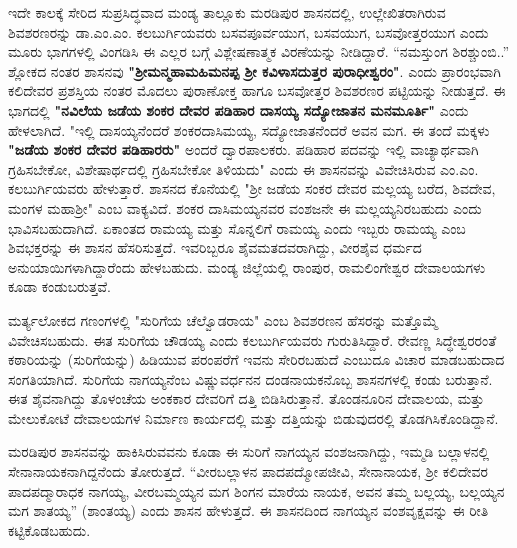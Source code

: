 ಇದೇ ಕಾಲಕ್ಕೆ ಸೇರಿದ ಸುಪ್ರಸಿದ್ಧವಾದ ಮಂಡ್ಯ ತಾಲ್ಲೂಕು ಮರಡಿಪುರ ಶಾಸನದಲ್ಲಿ, ಉಲ್ಲೇಖಿತರಾಗಿರುವ ಶಿವಶರಣರನ್ನು ಡಾ.ಎಂ.ಎಂ. ಕಲಬುರ್ಗಿಯವರು ಬಸವಪೂರ್ವಯುಗ, ಬಸವಯುಗ, ಬಸವೋತ್ತರಯುಗ ಎಂದು ಮೂರು ಭಾಗಗಳಲ್ಲಿ ವಿಂಗಡಿಸಿ ಈ ಎಲ್ಲರ ಬಗ್ಗೆ ವಿಶ್ಲೇಷಣಾತ್ಮಕ ವಿರಣೆಯನ್ನು ನೀಡಿದ್ದಾರೆ. “ನಮಸ್ತುಂಗ ಶಿರಶ್ಚುಂಬಿ..” ಶ್ಲೋಕದ ನಂತರ ಶಾಸನವು \textbf{"ಶ‍್ರೀಮನ್ಮಹಾಮಹಿಮನಪ್ಪ ಶ‍್ರೀ ಕವಿಳಾಸದುತ್ತರ ಪುರಾಧೀಶ್ವರಂ"}. ಎಂದು ಪ್ರಾರಂಭವಾಗಿ ಕಲಿದೇವರ ಪ್ರಶಸ್ತಿಯ ನಂತರ ಮೊದಲು ಪುರಾಣೋಕ್ತ ಹಾಗೂ ಬಸವೋತ್ತರ ಶಿವಶರಣರ ಪಟ್ಟಿಯನ್ನು ನೀಡುತ್ತದೆ. ಈ ಭಾಗದಲ್ಲಿ \textbf{"ನವಿಲೆಯ ಜಡೆಯ ಶಂಕರ ದೇವರ ಪಡಿಹಾರ ದಾಸಯ್ಯ ಸದ್ಯೋಜಾತನ ಮನಮೂರ್ತಿ"} ಎಂದು ಹೇಳಲಾಗಿದೆ. "ಇಲ್ಲಿ ದಾಸಯ್ಯನೆಂದರೆ ಶಂಕರದಾಸಿಮಯ್ಯ, ಸದ್ಯೋಜಾತನೆಂದರೆ ಅವನ ಮಗ. ಈ ತಂದೆ ಮಕ್ಕಳು \textbf{"ಜಡೆಯ ಶಂಕರ ದೇವರ ಪಡಿಹಾರರು"} ಅಂದರೆ ದ್ವಾರಪಾಲಕರು. ಪಡಿಹಾರ ಪದವನ್ನು ಇಲ್ಲಿ ವಾಚ್ಯಾರ್ಥವಾಗಿ ಗ್ರಹಿಸಬೇಕೋ, ವಿಶೇಷಾರ್ಥದಲ್ಲಿ ಗ್ರಹಿಸಬೇಕೋ ತಿಳಿಯದು" ಎಂದು ಈ ಶಾಸನವನ್ನು ವಿವೇಚಿಸಿರುವ ಎಂ.ಎಂ. ಕಲಬುರ್ಗಿಯವರು ಹೇಳುತ್ತಾರೆ. ಶಾಸನದ ಕೊನೆಯಲ್ಲಿ "ಶ‍್ರೀ ಜಡೆಯ ಸಂಕರ ದೇವರ ಮಲ್ಲಯ್ಯ ಬರೆದ, ಶಿವದೇವ, ಮಂಗಳ ಮಹಾಶ‍್ರೀ" ಎಂಬ ವಾಕ್ಯವಿದೆ. ಶಂಕರ ದಾಸಿಮಯ್ಯನವರ ವಂಶಜನೇ ಈ ಮಲ್ಲಯ್ಯನಿರಬಹುದು ಎಂದು ಭಾವಿಸಬಹುದಾಗಿದೆ. ಏಕಾಂತದ ರಾಮಯ್ಯ ಮತ್ತು ಸೊನ್ನಲಿಗೆ ರಾಮಯ್ಯ ಎಂದು ಇಬ್ಬರು ರಾಮಯ್ಯ ಎಂಬ ಶಿವಭಕ್ತರನ್ನು ಈ ಶಾಸನ ಹೆಸರಿಸುತ್ತದೆ. ಇವರಿಬ್ಬರೂ ಶೈವಮತದವರಾಗಿದ್ದು, ವೀರಶೈವ ಧರ್ಮದ ಅನುಯಾಯಿಗಳಾಗಿದ್ದಾರೆಂದು ಹೇಳಬಹುದು. ಮಂಡ್ಯ ಜಿಲ್ಲೆಯಲ್ಲಿ ರಾಂಪುರ, ರಾಮಲಿಂಗೇಶ್ವರ ದೇವಾಲಯಗಳು ಕೂಡಾ ಕಂಡುಬರುತ್ತವೆ.

ಮರ್ತ್ಯಲೋಕದ ಗಣಂಗಳಲ್ಲಿ "ಸುರಿಗೆಯ ಚೆಲ್ವೊಡರಾಯ" ಎಂಬ ಶಿವಶರಣನ ಹೆಸರನ್ನು ಮತ್ತೊಮ್ಮೆ ವಿವೇಚಿಸ\-ಬಹುದು. ಈತ ಸುರಿಗೆಯ ಚೌಡಯ್ಯ ಎಂದು ಕಲಬುರ್ಗಿಯವರು ಗುರುತಿಸಿದ್ದಾರೆ. ರೇವಣ್ಣ ಸಿದ್ಧೇಶ್ವರರಂತೆ ಕಠಾರಿಯನ್ನು (ಸುರಿಗೆಯನ್ನು) ಹಿಡಿಯುವ ಪರಂಪರೆಗೆ ಇವನು ಸೇರಿರಬಹುದೆ ಎಂಬುದೂ ವಿಚಾರ ಮಾಡಬಹುದಾದ ಸಂಗತಿಯಾಗಿದೆ. ಸುರಿಗೆಯ ನಾಗಯ್ಯನೆಂಬ ವಿಷ್ಣುವರ್ಧನನ ದಂಡನಾಯಕನೊಬ್ಬ ಶಾಸನಗಳಲ್ಲಿ ಕಂಡು ಬರುತ್ತಾನೆ. ಈತ ಶೈವನಾಗಿದ್ದು ತೊಳಂಚೆಯ ಅಂಕಕಾರ ದೇವರಿಗೆ ದತ್ತಿ ಬಿಡಿಸಿರುತ್ತಾನೆ. ತೊಂಡನೂರಿನ ದೇವಾಲಯ, ಮತ್ತು ಮೇಲುಕೋಟೆ ದೇವಾಲಯಗಳ ನಿರ್ಮಾಣ ಕಾರ್ಯದಲ್ಲಿ ಮತ್ತು ದತ್ತಿಯನ್ನು ಬಿಡುವುದರಲ್ಲಿ ತೊಡಗಿಸಿಕೊಂಡಿದ್ದಾನೆ. 

ಮರಡಿಪುರ ಶಾಸನವನ್ನು ಹಾಕಿಸಿರುವವನು ಕೂಡಾ ಈ ಸುರಿಗೆ ನಾಗಯ್ಯನ ವಂಶಜನಾಗಿದ್ದು, ಇಮ್ಮಡಿ ಬಲ್ಲಾಳನಲ್ಲಿ ಸೇನಾನಾಯಕನಾಗಿದ್ದನೆಂದು ತೋರುತ್ತದೆ. “ವೀರಬಲ್ಲಾಳನ ಪಾದಪದ್ಮೋಪಜೀವಿ, ಸೇನಾನಾಯಕ, ಶ‍್ರೀ ಕಲಿದೇವರ ಪಾದಪದ್ಮಾರಾಧಕ ನಾಗಯ್ಯ, ವೀರಬಮ್ಮಯ್ಯನ ಮಗ ಶಿಂಗನ ಮಾರೆಯ ನಾಯಕ, ಅವನ ತಮ್ಮ ಬಲ್ಲಯ್ಯ, ಬಲ್ಲಯ್ಯನ ಮಗ ಶಾತಯ್ಯ” (ಶಾಂತಯ್ಯ) ಎಂದು ಶಾಸನ ಹೇಳುತ್ತದೆ. ಈ ಶಾಸನದಿಂದ ನಾಗಯ್ಯನ ವಂಶವೃಕ್ಷವನ್ನು ಈ ರೀತಿ ಕಟ್ಟಿಕೊಡಬಹುದು.

